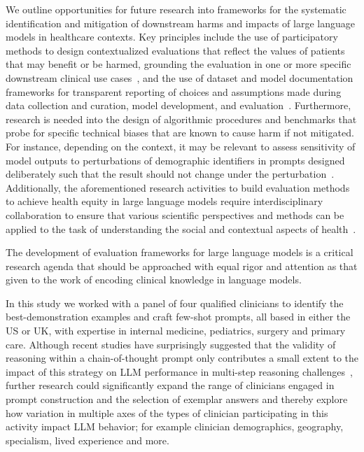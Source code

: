 \documentclass[10pt, letter, onecolumn]{arxiv}
\begin{document}
\begin{refsection}
We outline opportunities for future research into frameworks for the systematic identification and mitigation of downstream harms and impacts of large language models in healthcare contexts. Key principles include the use of participatory methods to design contextualized evaluations that reflect the values of patients that may benefit or be harmed, grounding the evaluation in one or more specific downstream clinical use cases~\cite{liu2022medical, raji2020closing}, and the use of dataset and model documentation frameworks for transparent reporting of choices and assumptions made during data collection and curation, model development, and evaluation~\cite{rostamzadeh2022healthsheet, gebru2021datasheets, mitchell2019model}. Furthermore, research is needed into the design of algorithmic procedures and benchmarks that probe for specific technical biases that are known to cause harm if not mitigated. For instance, depending on the context, it may be relevant to assess sensitivity of model outputs to perturbations of demographic identifiers in prompts designed deliberately such that the result should not change under the perturbation~\cite{garg2019counterfactual, prabhakaran2019perturbation, zhang2020hurtful}. Additionally, the aforementioned research activities to build evaluation methods to achieve health equity in large language models require interdisciplinary collaboration to ensure that various scientific perspectives and methods can be applied to the task of understanding the social and contextual aspects of health~\cite{matheny2022artificial, white2022blueprint, guidance2021ethics}. 

The development of evaluation frameworks for large language models is a critical research agenda that should be approached with equal rigor and attention as that given to the work of encoding clinical knowledge in  language models. 

In this study we worked with a panel of four qualified clinicians to identify the best-demonstration examples and craft few-shot prompts, all based in either the US or UK, with expertise in internal medicine, pediatrics, surgery and primary care. Although recent studies have surprisingly suggested that the validity of reasoning within a chain-of-thought prompt only contributes a small extent to the impact of this strategy on LLM performance in multi-step reasoning challenges~\cite{wang2022towards}, further research could significantly expand the range of clinicians engaged in prompt construction and the selection of exemplar answers and thereby explore how variation in multiple axes of the types of clinician participating in this activity impact LLM behavior; for example clinician demographics, geography, specialism, lived experience and more.


\end{refsection}
\end{document}
